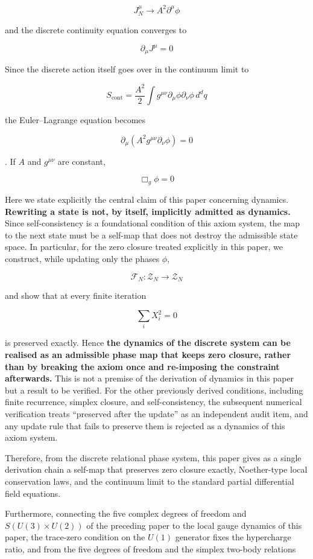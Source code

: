 \documentclass[
  a4paper,
]{article}
\begin{document}
\[
J_N^\mu
\longrightarrow
A^2\partial^\mu\phi
\]

and the discrete continuity equation converges to

\[
\boxed{
\partial_\mu J^\mu=0
}
\]

Since the discrete action itself goes over in the continuum limit to

\[
S_{\mathrm{cont}}
=
\frac{A^2}{2}
\int
g^{\mu\nu}
\partial_\mu\phi
\partial_\nu\phi
\,d^dq
\]

the Euler--Lagrange equation becomes

\[
\boxed{
\partial_\mu
\left(
A^2g^{\mu\nu}\partial_\nu\phi
\right)
=
0
}
\]

. If \(A\) and \(g^{\mu\nu}\) are constant,

\[
\boxed{
\Box_g\phi=0
}
\]

Here we state explicitly the central claim of this paper concerning
dynamics. \textbf{Rewriting a state is not, by itself, implicitly
admitted as dynamics.} Since self-consistency is a foundational
condition of this axiom system, the map to the next state must be a
self-map that does not destroy the admissible state space. In
particular, for the zero closure treated explicitly in this paper, we
construct, while updating only the phases \(\phi\),

\[
\boxed{
\mathcal F_N:\mathcal Z_N\to\mathcal Z_N
}
\]

and show that at every finite iteration

\[
\sum_iX_i^2=0
\]

is preserved exactly. Hence \textbf{the dynamics of the discrete system
can be realised as an admissible phase map that keeps zero closure,
rather than by breaking the axiom once and re-imposing the constraint
afterwards.} This is not a premise of the derivation of dynamics in this
paper but a result to be verified. For the other previously derived
conditions, including finite recurrence, simplex closure, and
self-consistency, the subsequent numerical verification treats
``preserved after the update'' as an independent audit item, and any
update rule that fails to preserve them is rejected as a dynamics of
this axiom system.

Therefore, from the discrete relational phase system, this paper gives
as a single derivation chain a self-map that preserves zero closure
exactly, Noether-type local conservation laws, and the continuum limit
to the standard partial differential field equations.

Furthermore, connecting the five complex degrees of freedom and
\(S(U(3)\times U(2))\) of the preceding paper to the local gauge
dynamics of this paper, the trace-zero condition on the \(U(1)\)
generator fixes the hypercharge ratio, and from the five degrees of
freedom and the simplex two-body relations
\end{document}
